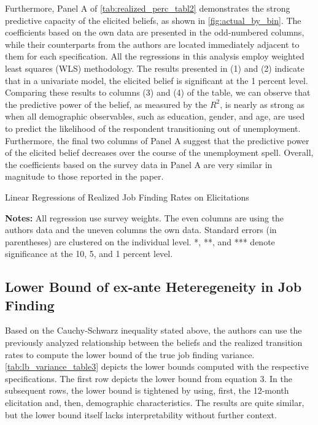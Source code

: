 \documentclass[11pt,a4paper,leqno]{article}
\begin{document}
Furthermore, Panel A of \autoref{tab:realized_perc_tabl2} demonstrates the strong predictive capacity of the elicited beliefs, as shown in \autoref{fig:actual_by_bin}. The coefficients based on the own data are presented in the odd-numbered columns, while their counterparts from the authors are located immediately adjacent to them for each specification. All the regressions in this analysis employ weighted least squares (WLS) methodology.
The results presented in (1) and (2) indicate that in a univariate model, the elicited belief is significant at the 1 percent level. Comparing these results to columns (3) and (4) of the table, we can observe that the predictive power of the belief, as measured by the $R^2$, is nearly as strong as when all demographic observables, such as education, gender, and age, are used to predict the likelihood of the respondent transitioning out of unemployment. Furthermore, the final two columns of Panel A suggest that the predictive power of the elicited belief decreases over the course of the unemployment spell. Overall, the coefficients based on the survey data in Panel A are very similar in magnitude to those reported in the paper.

\begin{table}[!htbp] \centering 
\tiny
\caption{Linear Regressions of Realized Job Finding Rates on Elicitations} 
\label{tab:realized_perc_tabl2}

\begin{minipage}[center]{0.9\textwidth}
	\caption*{\tiny \textbf{Notes:} All regression use survey weights. The even columns are using the authors data and the uneven columns the own data. 
		Standard errors (in parentheses) are clustered on the individual level. *, **, and *** denote significance at the 10, 5, and 1 percent level.}
\end{minipage}
\end{table}

\subsection*{Lower Bound of ex-ante Heteregeneity in Job Finding}

Based on the Cauchy-Schwarz inequality stated above, the authors can use the previously analyzed relationship between the beliefs and the realized transition rates to compute the lower bound of the true job finding variance. \autoref{tab:lb_variance_table3} depicts the lower bounds computed with the respective specifications. The first row depicts the lower bound from equation 3. In the subsequent rows, the lower bound is tightened by using, first, the 12-month elicitation and, then, demographic characteristics. The results are quite similar, but the lower bound itself lacks interpretability without further context.
\end{document}

